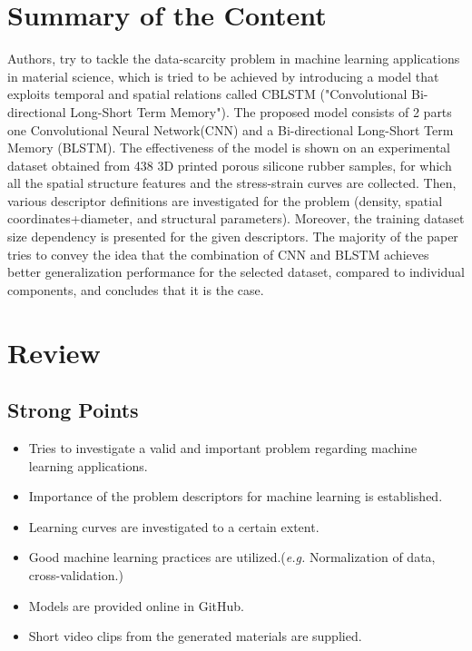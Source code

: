 \documentclass[a4paper,9pt]{article}
\title{\titletext}
\author{O.T. Turan}
\begin{document}
\maketitle

\section{Summary of the Content}
Authors, try to tackle the data-scarcity problem in machine learning applications in material science, which is tried to be achieved by introducing a  model that exploits temporal and spatial relations called CBLSTM ("Convolutional Bi-directional Long-Short Term Memory"). The proposed model consists of 2 parts one Convolutional Neural Network(CNN) and a Bi-directional Long-Short Term Memory (BLSTM). The effectiveness of the model is shown on an experimental dataset obtained from 438 3D printed porous silicone rubber samples, for which all the spatial structure features and the stress-strain curves are collected. Then, various descriptor definitions are investigated for the problem (density, spatial coordinates+diameter, and structural parameters). Moreover, the training dataset size dependency is presented for the given descriptors. The majority of the paper tries to convey the idea that the combination of CNN and BLSTM achieves better generalization performance for the selected dataset, compared to individual components, and concludes that it is the case.

\section{Review}

\subsection{Strong Points}
\begin{itemize}
    \item Tries to investigate a valid and important problem regarding machine learning applications.
    \item Importance of the problem descriptors for machine learning is established.
    \item Learning curves are investigated to a certain extent.
    \item Good machine learning practices are utilized.(\textit{e.g.} Normalization of data, cross-validation.)
    \item Models are provided online in GitHub.
    \item Short video clips from the generated materials are supplied.
\end{itemize}
\end{document}
